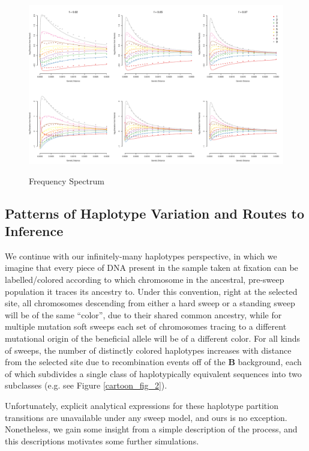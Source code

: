 \documentclass[a4paper,10pt]{article}
\begin{document}
\begin{figure}
	\includegraphics[width = \textwidth]{../Paper_Figures/freq_spec_nosweep_logfold_sixpanel_020507.pdf} \label{freq_spec}
	\caption{Frequency Spectrum}
\end{figure}

\subsection*{Patterns of Haplotype Variation and Routes to Inference}


We continue with our infinitely-many haplotypes perspective, in which we imagine that every piece of DNA present in the sample taken at fixation can be labelled/colored according to which chromosome in the ancestral, pre-sweep population it traces its ancestry to. Under this convention, right at the selected site, all chromosomes descending from either a hard sweep or a standing sweep will be of the same ``color'', due to their shared common ancestry, while for multiple mutation soft sweeps each set of chromosomes tracing to a different mutational origin of the beneficial allele will be of a different color. For all kinds of sweeps, the number of distinctly colored haplotypes increases with distance from the selected site due to recombination events off of the \textbf{B} background, each of which subdivides a single class of haplotypically equivalent sequences into two subclasses (e.g. see Figure \ref{cartoon_fig_2}).

Unfortunately, explicit analytical expressions for these haplotype partition transitions are unavailable under any sweep model, and ours is no exception. Nonetheless, we gain some insight from a simple description of the process, and this descriptions motivates some further simulations.
\end{document}
